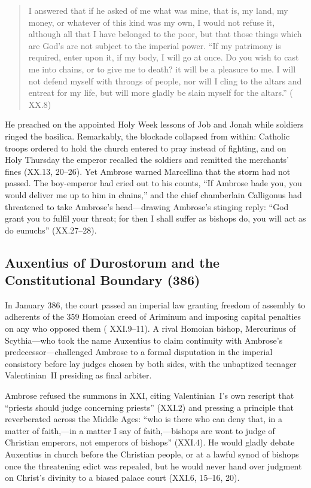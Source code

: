 \begin{quote}
I answered that if he asked of me what was mine, that is, my land, my money, or whatever of this kind was my own, I would not refuse it, although all that I have belonged to the poor, but that those things which are God's are not subject to the imperial power. ``If my patrimony is required, enter upon it, if my body, I will go at once. Do you wish to cast me into chains, or to give me to death? it will be a pleasure to me. I will not defend myself with throngs of people, nor will I cling to the altars and entreat for my life, but will more gladly be slain myself for the altars.'' ( XX.8)
\end{quote}

He preached on the appointed Holy Week lessons of Job and Jonah while soldiers ringed the basilica. Remarkably, the blockade collapsed from within: Catholic troops ordered to hold the church entered to pray instead of fighting, and on Holy Thursday the emperor recalled the soldiers and remitted the merchants' fines (XX.13, 20--26). Yet Ambrose warned Marcellina that the storm had not passed. The boy-emperor had cried out to his counts, ``If Ambrose bade you, you would deliver me up to him in chains,'' and the chief chamberlain Calligonus had threatened to take Ambrose's head---drawing Ambrose's stinging reply: ``God grant you to fulfil your threat; for then I shall suffer as bishops do, you will act as do eunuchs'' (XX.27--28).

\subsection{Auxentius of Durostorum and the Constitutional Boundary (386)}

In January 386, the court passed an imperial law granting freedom of assembly to adherents of the 359 Homoian creed of Ariminum and imposing capital penalties on any who opposed them ( XXI.9--11). A rival Homoian bishop, Mercurinus of Scythia---who took the name Auxentius to claim continuity with Ambrose's predecessor---challenged Ambrose to a formal disputation in the imperial consistory before lay judges chosen by both sides, with the unbaptized teenager Valentinian~II presiding as final arbiter.

Ambrose refused the summons in  XXI, citing Valentinian~I's own rescript that ``priests should judge concerning priests'' (XXI.2) and pressing a principle that reverberated across the Middle Ages: ``who is there who can deny that, in a matter of faith,---in a matter I say of faith,---bishops are wont to judge of Christian emperors, not emperors of bishops'' (XXI.4). He would gladly debate Auxentius in church before the Christian people, or at a lawful synod of bishops once the threatening edict was repealed, but he would never hand over judgment on Christ's divinity to a biased palace court (XXI.6, 15--16, 20).

